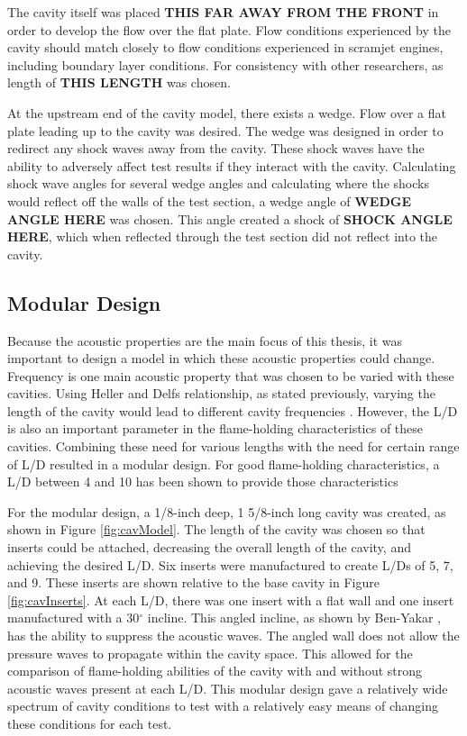 The cavity itself was placed \textbf{THIS FAR AWAY FROM THE FRONT} in order to develop the flow over the flat plate. Flow conditions experienced by the cavity should match closely to flow conditions experienced in scramjet engines, including boundary layer conditions. For consistency with other researchers, as length of \textbf{THIS LENGTH} was chosen.

At the upstream end of the cavity model, there exists a wedge. Flow over a flat plate leading up to the cavity was desired. The wedge was designed in order to redirect any shock waves away from the cavity. These shock waves have the ability to adversely affect test results if they interact with the cavity. Calculating shock wave angles for several wedge angles and calculating where the shocks would reflect off the walls of the test section, a wedge angle of \textbf{WEDGE ANGLE HERE} was chosen. This angle created a shock of \textbf{SHOCK ANGLE HERE}, which when reflected through the test section did not reflect into the cavity. 


\subsection{Modular Design}

Because the acoustic properties are the main focus of this thesis, it was important to design a model in which these acoustic properties could change. Frequency is one main acoustic property that was chosen to be varied with these cavities. Using Heller and Delfs relationship, as stated previously, varying the length of the cavity would lead to different cavity frequencies \cite{heller1996letter}. However, the L/D is also an important parameter in the flame-holding characteristics of these cavities. Combining these need for various lengths with the need for certain range of L/D resulted in a modular design. For good flame-holding characteristics, a L/D between 4 and 10 has been shown to provide those characteristics \cite{ben2001cavity}

For the modular design, a 1/8-inch deep, 1 5/8-inch long cavity was created, as shown in Figure \ref{fig:cavModel}. The length of the cavity was chosen so that inserts could be attached, decreasing the overall length of the cavity, and achieving the desired L/D. Six inserts were manufactured to create L/Ds of 5, 7, and 9. These inserts are shown relative to the base cavity in Figure \ref{fig:cavInserts}. At each L/D, there was one insert with a flat wall and one insert manufactured with a 30$^\circ$ incline. This angled incline, as shown by Ben-Yakar \cite{ben2001cavity}, has the ability to suppress the acoustic waves. The angled wall does not allow the pressure waves to propagate within the cavity space. This allowed for the comparison of flame-holding abilities of the cavity with and without strong acoustic waves present at each L/D. This modular design gave a relatively wide spectrum of cavity conditions to test with a relatively easy means of changing these conditions for each test. 

